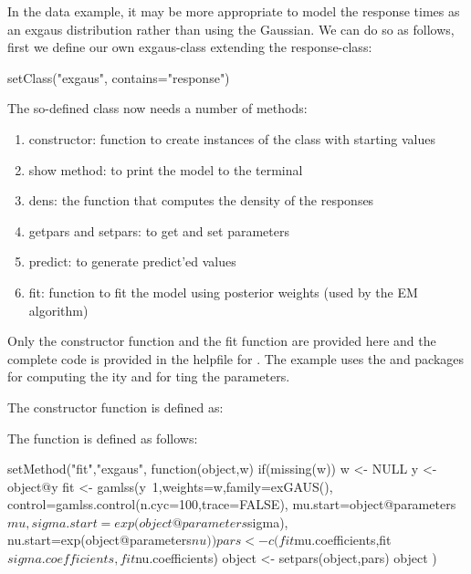 \documentclass[article]{jss}
\begin{document}
In the  data example, it may be more appropriate to model
the response times as an exgaus distribution rather than using the
Gaussian.  We can do so as follows, first we define our own
exgaus-class extending the response-class:
\begin{CodeChunk}
	setClass("exgaus", contains="response")
\end{CodeChunk}

The so-defined class now needs a number of methods: 
\begin{enumerate}
	\item constructor: function to create instances of the class 
	with starting values
	\item show method: to print the model to the terminal
	\item dens: the function that computes the density of the responses
	\item getpars and setpars: to get and set parameters 
	\item predict: to generate predict'ed values 
	\item fit: function to fit the model using posterior weights (used 
	by the EM algorithm)
\end{enumerate}

Only the constructor function and the fit function are provided here
and the complete code is provided in the helpfile for . 
The  example uses the  and  packages \cite{Stasinopoulos2009a,Stasinopoulos2009b} for 
computing the ity and for ting the parameters. 

The constructor function is defined as: 
\begin{CodeChunk}
\end{CodeChunk}

The  function is defined as follows: 
\begin{CodeChunk}
\begin{CodeInput}
setMethod("fit","exgaus",
	function(object,w) {
		if(missing(w)) w <- NULL
		y <- object@y
		fit <- gamlss(y~1,weights=w,family=exGAUS(),
			control=gamlss.control(n.cyc=100,trace=FALSE),
			mu.start=object@parameters$mu,
			sigma.start=exp(object@parameters$sigma),
			nu.start=exp(object@parameters$nu))
		pars <- c(fit$mu.coefficients,fit$sigma.coefficients,fit$nu.coefficients)
		object <- setpars(object,pars)
		object
	}
)
\end{CodeInput}
\end{CodeChunk}
\end{document}

